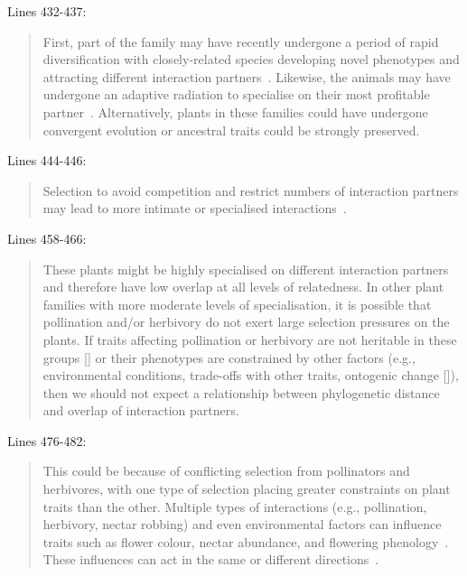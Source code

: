 \documentclass[12pt]{letter}
\begin{document}
		Lines 432-437:

		\begin{quotation}

			First, part of the family may have recently 
			undergone a period of rapid diversification with closely-related species 
			developing novel phenotypes and attracting different  
			interaction partners~\citep{Linder2008,Breitkopf2015}. Likewise, the
			animals may have undergone an adaptive radiation to 
			specialise on their most profitable partner~\citep{Janz2006}. 
			Alternatively, plants in these families could have undergone convergent evolution or ancestral traits could be strongly preserved.

		\end{quotation}


		Lines 444-446:

		\begin{quotation}

			Selection to avoid 
			competition and restrict numbers of interaction partners may lead to
			more intimate or specialised interactions~\citep{Ponisio2017}.

		\end{quotation}


		Lines 458-466:

		\begin{quotation}

			These plants might 
			be highly specialised on different interaction partners and therefore
			have low overlap at all levels of relatedness. In other plant families
			with more moderate levels of specialisation, it is possible 
			that pollination and/or herbivory do not exert large
			selection pressures on the plants. If traits affecting pollination
			or herbivory are not heritable in these groups [\citealp{Kursar2009}] 
			or their phenotypes are constrained by other factors (e.g., 
			environmental conditions, trade-offs with other traits, ontogenic
			change [\citealp{Karinho2014}]), then we should not expect a relationship 
			between phylogenetic distance and overlap of interaction partners.

		\end{quotation}


		Lines 476-482:

		\begin{quotation}

			This could be because of conflicting selection from pollinators and herbivores,
			with one type of selection placing greater constraints on plant traits than the other.
			Multiple types of interactions (e.g., pollination, herbivory, nectar robbing) 
			and even environmental factors can influence traits such as 
			flower colour, nectar abundance, and flowering phenology~\citep{Strauss2006}. 
			These influences can act in the same or different directions~\citep{Strauss2006}.

		\end{quotation}
\end{document}
